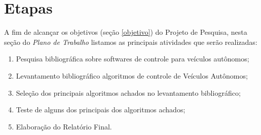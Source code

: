 \documentclass{article}
\begin{document}
\section{Etapas} \label{etapas}
A fim de alcançar os objetivos (seção \ref{objetivo}) do Projeto de Pesquisa, nesta seção do \textit{Plano de Trabalho} listamos as principais atividades que serão realizadas:


\begin{enumerate}
    \item Pesquisa bibliográfica sobre softwares de controle para veículos autônomos;
    \item Levantamento bibliográfico algoritmos de controle de Veículos Autônomos;
    \item Seleção dos principais algoritmos achados no levantamento bibliográfico;
    \item Teste de alguns dos principais dos algoritmos achados;
    \item Elaboração do Relatório Final.
\end{enumerate}
\end{document}
